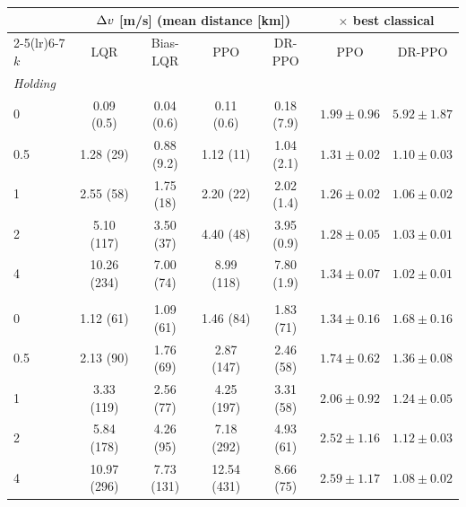 \begin{tabular}{lcccccc}
\toprule
 & \multicolumn{4}{c}{$\Delta v$ [m/s] (mean distance [km])} & \multicolumn{2}{c}{$\times$ best classical} \\
\cmidrule(lr){2-5}\cmidrule(lr){6-7}
$k$ & LQR & Bias-LQR & PPO & DR-PPO & PPO & DR-PPO \\
\midrule
\multicolumn{7}{l}{\emph{Holding}} \\
0 & 0.09 (0.5) & 0.04 (0.6) & 0.11 (0.6) & 0.18 (7.9) & $1.99 \pm 0.96$ & $5.92 \pm 1.87$ \\
0.5 & 1.28 (29) & 0.88 (9.2) & 1.12 (11) & 1.04 (2.1) & $1.31 \pm 0.02$ & $1.10 \pm 0.03$ \\
1 & 2.55 (58) & 1.75 (18) & 2.20 (22) & 2.02 (1.4) & $1.26 \pm 0.02$ & $1.06 \pm 0.02$ \\
2 & 5.10 (117) & 3.50 (37) & 4.40 (48) & 3.95 (0.9) & $1.28 \pm 0.05$ & $1.03 \pm 0.01$ \\
4 & 10.26 (234) & 7.00 (74) & 8.99 (118) & 7.80 (1.9) & $1.34 \pm 0.07$ & $1.02 \pm 0.01$ \\
\addlinespace
\multicolumn{7}{l}{\emph{Recovery}} \\
0 & 1.12 (61) & 1.09 (61) & 1.46 (84) & 1.83 (71) & $1.34 \pm 0.16$ & $1.68 \pm 0.16$ \\
0.5 & 2.13 (90) & 1.76 (69) & 2.87 (147) & 2.46 (58) & $1.74 \pm 0.62$ & $1.36 \pm 0.08$ \\
1 & 3.33 (119) & 2.56 (77) & 4.25 (197) & 3.31 (58) & $2.06 \pm 0.92$ & $1.24 \pm 0.05$ \\
2 & 5.84 (178) & 4.26 (95) & 7.18 (292) & 4.93 (61) & $2.52 \pm 1.16$ & $1.12 \pm 0.03$ \\
4 & 10.97 (296) & 7.73 (131) & 12.54 (431) & 8.66 (75) & $2.59 \pm 1.17$ & $1.08 \pm 0.02$ \\
\bottomrule
\end{tabular}
